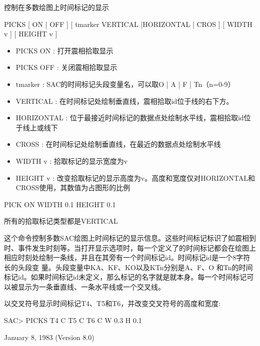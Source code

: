 \label{cmd:picks}

控制在多数绘图上时间标记的显示

PICKS [ ON | OFF ] [ tmarker VERTICAL |HORIZONTAL | CROS ] [ WIDTH v ] [ HEIGHT v ]

\begin{itemize}
\item PICKS ON : 打开震相拾取显示 
\item PICKS OFF : 关闭震相拾取显示 
\item tmarker : SAC的时间标记头段变量名，可以取O | A | F | Tn（n=0-9）
\item VERTICAL : 在时间标记处绘制垂直线，震相拾取id位于线的右下方。
\item HORIZONTAL : 位于最接近时间标记的数据点处绘制水平线，震相拾取id位于线上或线下
\item CROSS : 在时间标记处绘制垂直线，在最近的数据点处绘制水平线 
\item WIDTH v : 拾取标记的显示宽度为v 
\item HEIGHT v : 改变拾取标记的显示高度为v。高度和宽度仅对HORIZONTAL和CROSS使用，其数值为占图形的比例 
\end{itemize}

PICK ON WIDTH 0.1 HEIGHT 0.1

所有的拾取标记类型都是VERTICAL

这个命令控制多数SAC绘图上时间标记的显示信息。这些时间标记标识了如震相到时、事件发生时刻等。当打开显示选项时，每一个定义了的时间标记都会在绘图上相应时刻处绘制一条线，并且在其旁有一个时间标记id。时间标记id是一个8字符长的头段变	量。头段变量中KA、KF、KO以及KTn分别是A、F、O 和Tn的时间标记id。如果时间标记id未定义，那么标记的名字就是就本身。每一个时间标记可以被显示为一条垂直线、一条水平线或一个交叉线。

以交叉符号显示时间标记T4、T5和T6，并改变交叉符号的高度和宽度:
\begin{SACCode}
SAC> PICKS T4 C T5 C T6 C W 0.3 H 0.1
\end{SACCode}

January 8, 1983 (Version 8.0)

